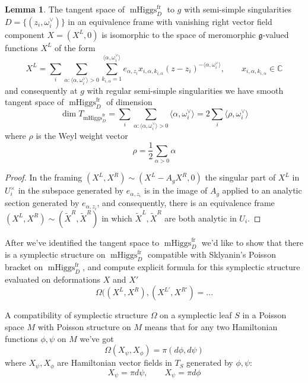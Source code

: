 \documentclass[11pt, oneside, reqno]{amsart}
\theoremstyle{definition} \newtheorem{definition}{Definition}[section]
\newtheorem{lemma}[definition]{Lemma}
\theoremstyle{definition} \newtheorem{remark}[definition]{Remark}
\theoremstyle{definition} \newtheorem{remarks}[definition]{Remarks}
\theoremstyle{definition} \newtheorem{question}[definition]{Question}
\theoremstyle{definition} \newtheorem*{note}{Note}
\theoremstyle{definition} \newtheorem{example}[definition]{Example}
\theoremstyle{definition} \newtheorem{examples}[definition]{Examples}
\renewcommand{\gg}{\mathfrak{g}}
\DeclareMathOperator{\mhiggs}{mHiggs}
\newcommand{\fr}{\mathrm{fr}}
\begin{document}
\begin{lemma}
  The tangent space of $\mhiggs^{\fr}_{D}$ to $g$ with semi-simple singularities 
  $D = \{(z_i, \omega^{\vee}_{i})\}$ in an equivalence frame with
  vanishing right vector field component $X = (X^{L}, 0)$ is isomorphic to the
  space of meromorphic $\gg$-valued functions $X^{L}$ of the form
  \begin{equation}
\label{eq:XL}
    X^{L} = \sum_{i} \sum_{\alpha: \langle \alpha, \omega_i^{\vee} \rangle > 0 }
    \sum_{k_{i, \alpha} = 1}^{ \langle \alpha , \omega_i^{\vee} \rangle} e_{\alpha,{z_i}} x_{i, \alpha, k_{i, \alpha}} (z - z_i)^{-\langle \alpha, \omega_i^{\vee}\rangle }, \qquad x_{i, \alpha, k_{i, \alpha}} \in \mathbb{C}
  \end{equation}
  and consequently at $g$ with regular semi-simple singularities we have smooth
  tangent space of $\mhiggs^{\fr}_{D}$ of dimension 
  \begin{equation}
\dim T_{\mhiggs^{\fr}_{D}} = \sum_{i} \sum_{\alpha: \langle \alpha, \omega_i^{\vee} \rangle > 0 } \langle \alpha, \omega_i^{\vee} \rangle = 2 \sum_{i} \langle \rho, \omega^{\vee}_i\rangle 
  \end{equation}
  where $\rho$ is the Weyl weight vector
  \begin{equation}
    \rho = \frac 1 2 \sum_{\alpha > 0} \alpha 
  \end{equation}
\end{lemma}
\begin{proof}
  In the framing $(X^{L}, X^{R}) \sim (X^{L} - A_{g} X^{R}, 0 )$ the singular
  part of $X^{L}$ in $U_{i}^{\times}$ in the subspace generated by $e_{\alpha, z_i}$
  is in the image of $A_{g}$ applied to an analytic section generated by $e_{\alpha, z_i}$,
  and consequently, there is an equivalence frame $(X^{L}, X^{R}) \sim (\tilde X^{R}, \tilde X^{R})$
  in which $\tilde X^{L}, \tilde X^{R}$ are both analytic in $U_{i}$. 
\end{proof}

After we've identified the tangent space to $\mhiggs_{D}^{\fr}$ we'd like to show that
there is a symplectic structure on $\mhiggs_{D}^{\fr}$ compatible with Sklyanin's Poisson
bracket on $\mhiggs_{D}^{\fr}$, and compute explicit formula for this symplectic
structure evaluated on deformations $X$ and $X'$
\begin{equation}
   \Omega ((X^{L}, X^{R}), (X^{L'}, X^{R'}) = ...
 \end{equation}

 A compatibility of symplectic structure $\Omega$ on a symplectic leaf $S$ in a Poisson space $M$
 with Poisson structure on $M$  means that for any two Hamiltonian functions $\phi, \psi$ on $M$
 we've got
 \begin{equation}
   \Omega(X_{\psi}, X_{\phi}) = \pi (d\phi, d \psi)
 \end{equation}
 where $X_{\psi}, X_{\phi}$ are Hamiltonian vector fields in $T_{S}$ generated by $\phi, \psi$:
 \begin{equation}
   X_{\psi} = \pi d \psi, \qquad X_{\psi} = \pi d \phi 
 \end{equation}
\end{document}
